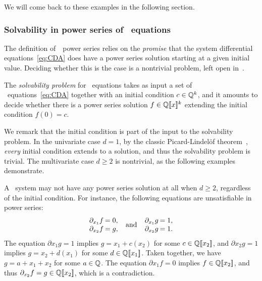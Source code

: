 \noindent
We will come back to these examples in the following section.

\subsubsection{Solvability in power series of \CDA~equations}
\label{sec:solvability of CDA equations}

The definition of~\CDA~power series relies on the \emph{promise}
that the system differential equations~\cref{eq:CDA} does have a power series solution starting at a given initial value.
%
Deciding whether this is the case is a nontrivial problem,
left open in~\cite[Remark 27]{Clemente:CONCUR:2024}.
%
\begin{problem}
    \label{problem:CDA solvability}
    The \emph{solvability problem} for \CDA~equations
    takes as input a set of \CDA~equations~\cref{eq:CDA}
    together with an initial condition $c \in \mathbb Q^k$,
    and it amounts to decide whether there is a power series solution $f \in \mathbb Q[\![x]\!]^k$ 
    extending the initial condition $f(0) = c$.
\end{problem}
%
\noindent
We remark that the initial condition is part of the input to the solvability problem.
In the univariate case $d = 1$,
by the classic Picard-Lindelöf theorem~\cite[Theorem 3.1]{CoddingtonLevinson:1984},
\emph{every} initial condition extends to a solution,
and thus the solvability problem is trivial.
%
The multivariate case $d \geq 2$ is nontrivial,
as the following examples demonstrate.

\begin{example}
    \label{ex:CDA unsolvable system}
    A \CDA~system may not have any power series solution at all when $d \geq 2$,
    regardless of the initial condition.
    For instance, the following equations are unsatisfiable in power series:
    \begin{align*}
        \arraycolsep=1pt
        \begin{array}{rl}
            \partial {x_1} f &= 0, \\
            \partial {x_2} f &= g,
        \end{array}
        \quad \text{and} \quad
        \begin{array}{rl}
            \partial {x_1} g &= 1, \\
            \partial {x_2} g &= 1.
        \end{array}
    \end{align*}
    The equation $\partial {x_1} g = 1$ implies $g = x_1 + c(x_2)$ for some $c \in \mathbb Q[\![x_2]\!]$,
    and $\partial {x_2} g = 1$ implies $g = x_2 + d(x_1)$ for some $d \in \mathbb Q[\![x_1]\!]$.
    Taken together, we have $g = a + x_1 + x_2$ for some $a \in \mathbb Q$.
    The equation $\partial {x_1} f = 0$ implies $f \in \mathbb Q[\![x_2]\!]$,
    and thus $\partial {x_2} f = g \in \powerseries \Q {x_2}$, which is a contradiction.
\end{example}

